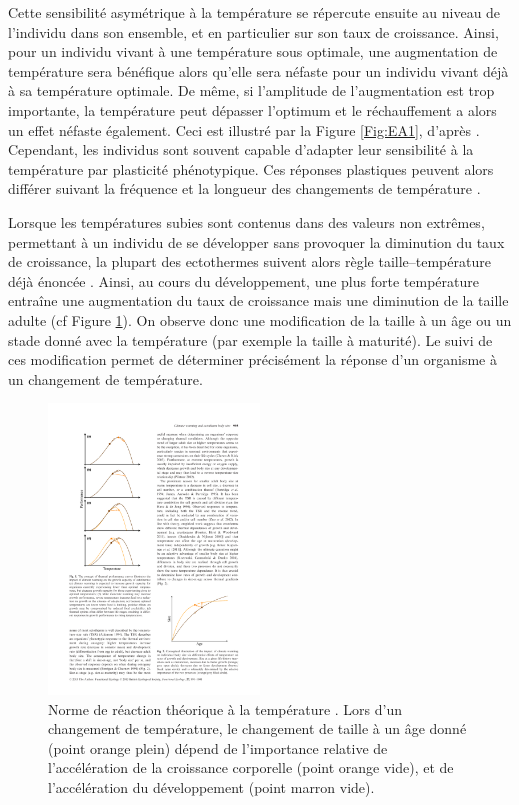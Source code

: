 Cette sensibilité asymétrique à la température se répercute ensuite au niveau
de l'individu dans son ensemble, et en particulier sur son taux de croissance.
Ainsi, pour un individu vivant à une température sous optimale, une augmentation
de température sera bénéfique alors qu'elle sera néfaste pour un individu vivant
déjà à sa température optimale. De même, si l'amplitude de l'augmentation est
trop importante, la température peut dépasser l'optimum et le réchauffement a
alors un effet néfaste également. Ceci est illustré par la Figure
\ref{Fig:EA1}, d'après \textcites{ohlberger2013a}. Cependant, les individus sont
souvent capable d'adapter leur sensibilité à la température par plasticité
phénotypique. Ces réponses plastiques peuvent alors différer suivant la
fréquence et la longueur des changements de température
\autocites{angilletta2009a, huey1999a}.

Lorsque les températures subies sont contenus dans des valeurs non
extrêmes, permettant à un individu de se développer sans provoquer la diminution
du taux de croissance, la plupart des ectothermes suivent alors règle
taille--température déjà énoncée \autocite{atkinson1994a}. Ainsi, au cours du
développement, une plus forte température entraîne une augmentation du taux de
croissance mais une diminution de la taille adulte (cf Figure \ref{Fig:EA2}). On
observe donc une modification de la taille à un âge ou un stade donné avec la température (par
exemple la taille à maturité). Le suivi de ces modification permet de
déterminer précisément la réponse d'un organisme à un changement de température. 

\begin{figure}[!ht] %
\centering
\includegraphics[width=0.5\textwidth]{1_CorpsDeThese/EA/Fig/ThermalNorm}
\caption[
Norme de réaction à la température]{Norme de réaction théorique à la
température \autocites[Figure 2]{ohlberger2013a}. Lors d'un changement de
température, le changement de taille à un âge donné (point orange plein) dépend
de l'importance relative de l'accélération de la croissance corporelle (point
orange vide), et de l'accélération du développement (point marron vide).}
\label{Fig:EA2}
\end{figure}

